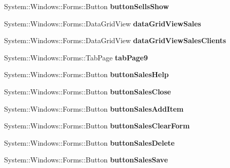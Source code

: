 \begin{DoxyCompactItemize}
System\+::\+Windows\+::\+Forms\+::\+Button {\bfseries button\+Sells\+Show}
\item 
\hypertarget{class_magazyn_1_1_magazin_aa8936c0a094a1153badf2e98f50f3dc2}{}\label{class_magazyn_1_1_magazin_aa8936c0a094a1153badf2e98f50f3dc2} 
System\+::\+Windows\+::\+Forms\+::\+Data\+Grid\+View {\bfseries data\+Grid\+View\+Sales}
\item 
\hypertarget{class_magazyn_1_1_magazin_a3c13fc64dc8be65c99aa0ab2f79d86d4}{}\label{class_magazyn_1_1_magazin_a3c13fc64dc8be65c99aa0ab2f79d86d4} 
System\+::\+Windows\+::\+Forms\+::\+Data\+Grid\+View {\bfseries data\+Grid\+View\+Sales\+Clients}
\item 
\hypertarget{class_magazyn_1_1_magazin_a6c2abf28f143b5e079d506e1cd0f6d54}{}\label{class_magazyn_1_1_magazin_a6c2abf28f143b5e079d506e1cd0f6d54} 
System\+::\+Windows\+::\+Forms\+::\+Tab\+Page {\bfseries tab\+Page9}
\item 
\hypertarget{class_magazyn_1_1_magazin_a2c5e283c60ce276255b3cac41516fecb}{}\label{class_magazyn_1_1_magazin_a2c5e283c60ce276255b3cac41516fecb} 
System\+::\+Windows\+::\+Forms\+::\+Button {\bfseries button\+Sales\+Help}
\item 
\hypertarget{class_magazyn_1_1_magazin_ae52b6a657ec8829964dac6a7754a3879}{}\label{class_magazyn_1_1_magazin_ae52b6a657ec8829964dac6a7754a3879} 
System\+::\+Windows\+::\+Forms\+::\+Button {\bfseries button\+Sales\+Close}
\item 
\hypertarget{class_magazyn_1_1_magazin_a29315acb4643a10c23c99970819e095c}{}\label{class_magazyn_1_1_magazin_a29315acb4643a10c23c99970819e095c} 
System\+::\+Windows\+::\+Forms\+::\+Button {\bfseries button\+Sales\+Add\+Item}
\item 
\hypertarget{class_magazyn_1_1_magazin_a585382ee535b3137773562ac0c2c6670}{}\label{class_magazyn_1_1_magazin_a585382ee535b3137773562ac0c2c6670} 
System\+::\+Windows\+::\+Forms\+::\+Button {\bfseries button\+Sales\+Clear\+Form}
\item 
\hypertarget{class_magazyn_1_1_magazin_a8bc049a4a37181cd2b00a58c25f90c33}{}\label{class_magazyn_1_1_magazin_a8bc049a4a37181cd2b00a58c25f90c33} 
System\+::\+Windows\+::\+Forms\+::\+Button {\bfseries button\+Sales\+Delete}
\item 
\hypertarget{class_magazyn_1_1_magazin_a7ec7eb37bc0153a2455e574f13c003f0}{}\label{class_magazyn_1_1_magazin_a7ec7eb37bc0153a2455e574f13c003f0} 
System\+::\+Windows\+::\+Forms\+::\+Button {\bfseries button\+Sales\+Save}
\item 
\hypertarget{class_magazyn_1_1_magazin_a3d3fe9b29d93fac37c971f65b76a01da}{}\label{class_magazyn_1_1_magazin_a3d3fe9b29d93fac37c971f65b76a01da} 

\end{DoxyCompactItemize}
